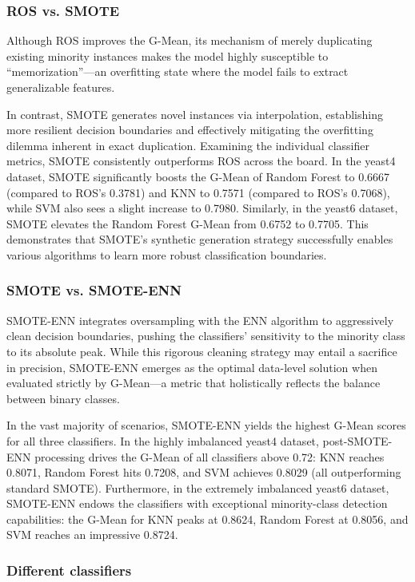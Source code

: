 \documentclass[sigconf]{acmart}
\begin{document}
\subsubsection{ROS vs. SMOTE}
Although ROS improves the G-Mean, its mechanism of merely duplicating existing minority instances makes the model highly susceptible to ``memorization''—an overfitting state where the model fails to extract generalizable features. 

In contrast, SMOTE generates novel instances via interpolation, establishing more resilient decision boundaries and effectively mitigating the overfitting dilemma inherent in exact duplication. Examining the individual classifier metrics, SMOTE consistently outperforms ROS across the board. In the yeast4 dataset, SMOTE significantly boosts the G-Mean of Random Forest to 0.6667 (compared to ROS's 0.3781) and KNN to 0.7571 (compared to ROS's 0.7068), while SVM also sees a slight increase to 0.7980. Similarly, in the yeast6 dataset, SMOTE elevates the Random Forest G-Mean from 0.6752 to 0.7705. This demonstrates that SMOTE's synthetic generation strategy successfully enables various algorithms to learn more robust classification boundaries.


\subsubsection{SMOTE vs. SMOTE-ENN}
SMOTE-ENN integrates oversampling with the ENN algorithm to aggressively clean decision boundaries, pushing the classifiers' sensitivity to the minority class to its absolute peak. While this rigorous cleaning strategy may entail a sacrifice in precision, SMOTE-ENN emerges as the optimal data-level solution when evaluated strictly by G-Mean—a metric that holistically reflects the balance between binary classes. 

In the vast majority of scenarios, SMOTE-ENN yields the highest G-Mean scores for all three classifiers. In the highly imbalanced yeast4 dataset, post-SMOTE-ENN processing drives the G-Mean of all classifiers above 0.72: KNN reaches 0.8071, Random Forest hits 0.7208, and SVM achieves 0.8029 (all outperforming standard SMOTE). Furthermore, in the extremely imbalanced yeast6 dataset, SMOTE-ENN endows the classifiers with exceptional minority-class detection capabilities: the G-Mean for KNN peaks at 0.8624, Random Forest at 0.8056, and SVM reaches an impressive 0.8724. 

\subsubsection{Different classifiers}
\end{document}
